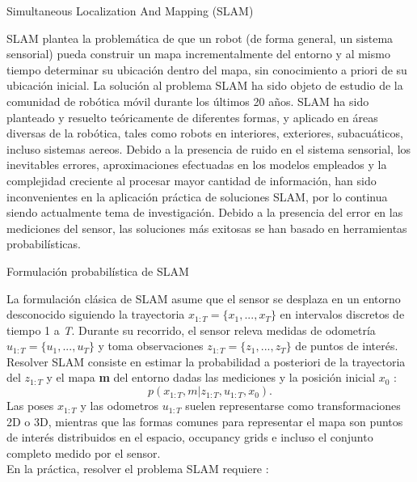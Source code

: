 \begin{subsection}{ Simultaneous Localization And Mapping (SLAM) }

SLAM plantea la problemática de que un robot (de forma general, un sistema sensorial) pueda construir un mapa incrementalmente del entorno y al mismo tiempo determinar su ubicación dentro del mapa, sin conocimiento a priori de su ubicación inicial. La solución al problema SLAM ha sido objeto de estudio de la comunidad de robótica móvil durante los últimos 20 años. SLAM ha sido planteado y resuelto teóricamente de diferentes formas, y aplicado en áreas diversas de la robótica, tales como robots en interiores, exteriores, subacuáticos, incluso sistemas aereos. Debido a la presencia de ruido en el sistema sensorial, los inevitables errores, aproximaciones efectuadas en los modelos empleados y la complejidad creciente al procesar mayor cantidad de información, han sido inconvenientes en la aplicación práctica de soluciones SLAM, por lo continua siendo actualmente tema de investigación. Debido a la presencia del error en las mediciones del sensor, las soluciones más exitosas se han basado en herramientas probabilísticas.

\begin{subsection}{Formulación probabilística de SLAM}

La formulación clásica de SLAM asume que el sensor se desplaza en un entorno desconocido siguiendo la trayectoria \textbf{ $ x_{1:T} = \{x_{1}, ..., x_{T}\} $ } en intervalos discretos de tiempo 1 a \textsl{T}. Durante su recorrido, el sensor releva medidas de odometría \textbf{ $ u_{1:T} = \{u_{1}, ..., u_{T}\} $ } y toma observaciones \textbf{ $ z_{1:T} = \{z_{1}, ..., z_{T}\} $ } de puntos de interés. Resolver SLAM consiste en estimar la probabilidad a posteriori de la trayectoria del \textbf{$z_{1:T}$} y el mapa \textbf{m} del entorno dadas las mediciones y la posición inicial \textbf{$x_{0}$} : 
\begin{equation}
p(\textbf{$x_{1:T}, m | z_{1:T}, u_{1:T}, x_{0}$}).
\end{equation}
Las poses \textbf{$x_{1:T}$} y las odometros \textbf{$u_{1:T}$} suelen representarse como transformaciones 2D o 3D, mientras que las formas comunes para representar el mapa son puntos de interés distribuidos en el espacio, occupancy grids e incluso el conjunto completo medido por el sensor. \\
En la práctica, resolver el problema SLAM requiere :
\begin{itemize}


\end{itemize}
\end{subsection}
\end{subsection}
